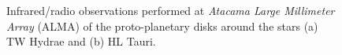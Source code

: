 

    \vfill
    \begin{figure}[h!]
        \centering
        \begin{minipage}{.5\linewidth}
            \centering
        \end{minipage}%
        \begin{minipage}{.5\linewidth}
            \centering
        \end{minipage}
        \caption{
            Infrared/radio observations performed at \textit{Atacama Large Millimeter Array} (ALMA) 
            of the proto-planetary disks around the stars (a) TW Hydrae and (b) HL Tauri. \\
            \vspace{2.5mm}
         }
        \label{fig:ppd_alma_observations}
    \end{figure}

